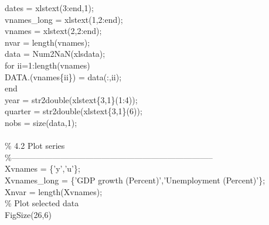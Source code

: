 \hspace{1mm}dates = xlstext(3:end,1); \\ 
\hspace{1mm}vnames\_long = xlstext(1,2:end); \\ 
\hspace{1mm}vnames = xlstext(2,2:end); \\ 
\hspace{1mm}nvar = length(vnames); \\ 
\hspace{1mm}data   = Num2NaN(xlsdata); \\ 
\hspace{1mm}\textcolor{matlabblue}{for} ii=1:length(vnames) \\ 
\hspace{1mm}\hspace{5mm} DATA.(vnames\{ii\}) = data(:,ii); \\ 
\hspace{1mm}\textcolor{matlabblue}{end} \\ 
\hspace{1mm}year = str2double(xlstext\{3,1\}(1:4)); \\ 
\hspace{1mm}quarter = str2double(xlstext\{3,1\}(6)); \\ 
\hspace{1mm}nobs = size(data,1); \\ 
\hspace{1mm} \\ 
\hspace{1mm}\textcolor{matlabgreen}{\% 4.2 Plot series }\\ 
\hspace{1mm}\textcolor{matlabgreen}{\%--------------------------------------------------------------------------  }\\ 
\hspace{1mm}Xvnames      = \{\textcolor{matlabpurple}{'y'},\textcolor{matlabpurple}{'u'}\}; \\ 
\hspace{1mm}Xvnames\_long = \{\textcolor{matlabpurple}{'GDP growth (Percent)'},\textcolor{matlabpurple}{'Unemployment (Percent)'}\}; \\ 
\hspace{1mm}Xnvar        = length(Xvnames); \\ 
\hspace{1mm}\textcolor{matlabgreen}{\% Plot selected data }\\ 
\hspace{1mm}FigSize(26,6) \\ 
